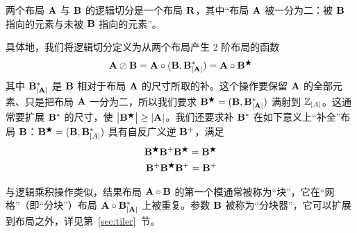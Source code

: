 \label{sec:logical_divide}

两个布局 $\mathbf{A}$ 与 $\mathbf{B}$ 的逻辑切分是一个布局 $\mathbf{R}$，其中“布局 $\mathbf{A}$ 被一分为二：被 $\mathbf{B}$ 指向的元素与未被 $\mathbf{B}$ 指向的元素”。

具体地，我们将逻辑切分定义为从两个布局产生 2 阶布局的函数
\begin{align*}
\mathbf{A} \oslash \mathbf{B} = \mathbf{A} \circ (\mathbf{B}, \mathbf{B}^*_{\left| {\mathbf{A}} \right|}) = \mathbf{A} \circ \mathbf{B}^\bigstar
\end{align*}
其中 $\mathbf{B}^*_{\left| {\mathbf{A}} \right|}$ 是 $\mathbf{B}$ 相对于布局 $\mathbf{A}$ 的尺寸所取的补。这个操作要保留 $\mathbf{A}$ 的全部元素、只是把布局 $\mathbf{A}$ 一分为二，所以我们要求 $\mathbf{B}^\bigstar = (\mathbf{B},\mathbf{B}^*_{\left| {\mathbf{A}} \right|})$ 满射到 $\mathbb{Z}_{\left| {A} \right|}$。这通常要扩展 $\mathbf{B}^*$ 的尺寸，使 $\left| {\mathbf{B}^\bigstar} \right| \geq \left| {\mathbf{A}} \right|$。我们还要求补 $\mathbf{B}^*$ 在如下意义上“补全”布局 $\mathbf{B}$：$\mathbf{B}^\bigstar = (\mathbf{B},\mathbf{B}^*_{\left| {A} \right|})$ 具有自反广义逆 $\mathbf{B}^+$，满足
\begin{align}
\mathbf{B}^\bigstar \mathbf{B}^+ \mathbf{B}^\bigstar = \mathbf{B}^\bigstar \\
\mathbf{B}^+ \mathbf{B}^\bigstar \mathbf{B}^+ = \mathbf{B}^+
\end{align}

与逻辑乘积操作类似，结果布局 $\mathbf{A} \circ \mathbf{B}$ 的第一个模通常被称为“块”，它在“网格”（即“分块”）布局 $\mathbf{A} \circ \mathbf{B}^*_{\left| {\mathbf{A}} \right|}$ 上被重复。参数 $\mathbf{B}$ 被称为“分块器”，它可以扩展到布局之外，详见第~\ref{sec:tiler}~节。

